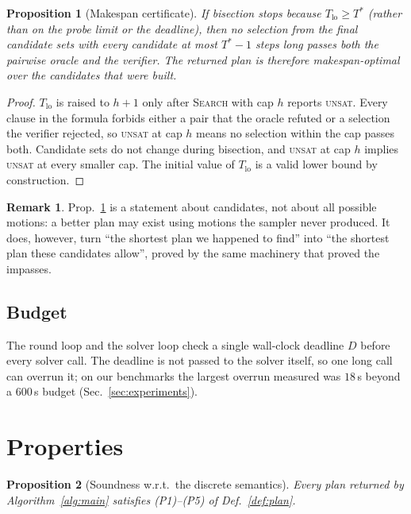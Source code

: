 \documentclass[conference]{IEEEtran}
\theoremstyle{plain}
\newtheorem{proposition}{Proposition}
\theoremstyle{definition}
\newtheorem{remark}{Remark}
\begin{document}
\begin{proposition}[Makespan certificate]
\label{prop:bisect}
If bisection stops because $T_{\text{lo}} \ge T^\ast$ (rather than on the probe limit or the
deadline), then no selection from the final candidate sets with every candidate at most
$T^\ast - 1$ steps long passes both the pairwise oracle and the verifier. The returned plan is
therefore makespan-optimal \emph{over the candidates that were built}.
\end{proposition}

\begin{proof}
$T_{\text{lo}}$ is raised to $h+1$ only after \textsc{Search} with cap $h$ reports
\textsc{unsat}. Every clause in the formula forbids either a pair that the oracle refuted or a
selection the verifier rejected, so \textsc{unsat} at cap $h$ means no selection within the
cap passes both. Candidate sets do not change during bisection, and \textsc{unsat} at cap $h$
implies \textsc{unsat} at every smaller cap. The initial value of $T_{\text{lo}}$ is a valid
lower bound by construction.
\end{proof}

\begin{remark}
Prop.~\ref{prop:bisect} is a statement about candidates, not about all possible motions: a
better plan may exist using motions the sampler never produced. It does, however, turn
``the shortest plan we happened to find'' into ``the shortest plan these candidates
allow'', proved by the same machinery that proved the impasses.
\end{remark}

\subsection{Budget}

The round loop and the solver loop check a single wall-clock deadline $D$ before every solver
call. The deadline is not passed to the solver itself, so one long call can overrun it; on our
benchmarks the largest overrun measured was $18$\,s beyond a $600$\,s budget
(Sec.~\ref{sec:experiments}).

\section{Properties}
\label{sec:properties}

\begin{proposition}[Soundness w.r.t.\ the discrete semantics]
\label{prop:sound}
Every plan returned by Algorithm~\ref{alg:main} satisfies (P1)--(P5) of Def.~\ref{def:plan}.
\end{proposition}
\end{document}
